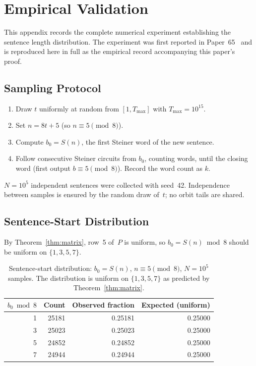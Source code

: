 \documentclass[12pt]{article}
\theoremstyle{definition}
\theoremstyle{remark}
\newcommand{\Sm}{S}
\begin{document}
\section{Empirical Validation}
\label{app:empirical}

This appendix records the complete numerical experiment establishing the sentence
length distribution. The experiment was first reported in Paper~65~\cite{paper65}
and is reproduced here in full as the empirical record accompanying this paper's proof.

\subsection*{Sampling Protocol}

\begin{enumerate}
  \item Draw $t$ uniformly at random from $[1, T_{\max}]$ with $T_{\max} = 10^{15}$.
  \item Set $n = 8t + 5$ (so $n \equiv 5 \pmod{8}$).
  \item Compute $b_0 = \Sm(n)$, the first Steiner word of the new sentence.
  \item Follow consecutive Steiner circuits from $b_0$, counting words, until
        the closing word (first output $b \equiv 5 \pmod{8}$). Record the word count as $k$.
\end{enumerate}

$N = 10^5$ independent sentences were collected with seed~42. Independence between
samples is ensured by the random draw of~$t$; no orbit tails are shared.

\subsection*{Sentence-Start Distribution}

By Theorem~\ref{thm:matrix}, row~5 of~$P$ is uniform, so $b_0 = \Sm(n) \bmod 8$
should be uniform on $\{1,3,5,7\}$.

\begin{table}[h]
\centering
\begin{tabular}{rrrr}
\toprule
$b_0 \bmod 8$ & Count & Observed fraction & Expected (uniform) \\
\midrule
1 & 25181 & 0.25181 & 0.25000 \\
3 & 25023 & 0.25023 & 0.25000 \\
5 & 24852 & 0.24852 & 0.25000 \\
7 & 24944 & 0.24944 & 0.25000 \\
\bottomrule
\end{tabular}
\caption{Sentence-start distribution: $b_0 = \Sm(n)$, $n \equiv 5\pmod{8}$,
$N = 10^5$ samples. The distribution is uniform on $\{1,3,5,7\}$ as predicted
by Theorem~\ref{thm:matrix}.}
\label{tab:start}
\end{table}
\end{document}
